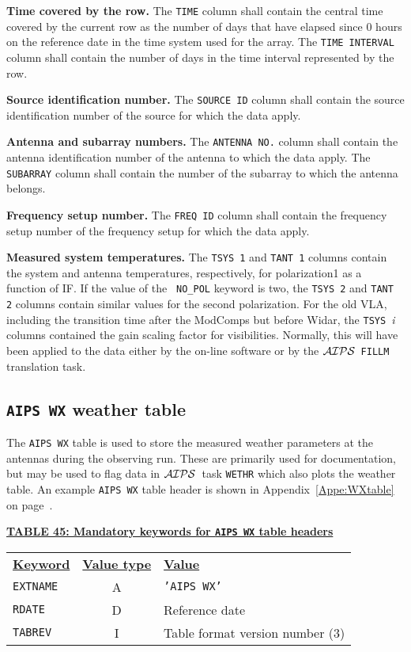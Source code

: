 \documentclass[twoside]{article}
\newcommand{\AIPS}{{$\cal AIPS\/$}}
\begin{document}
{\bf Time covered by the row.}  The {\tt TIME} column shall contain
the central time covered by the current row as the number of days
that have elapsed since 0 hours on the reference date in the time
system used for the array.  The {\tt TIME INTERVAL} column shall
contain the number of days in the time interval represented by the
row.

{\bf Source identification number.}  The {\tt SOURCE ID} column shall
contain the source identification number of the source for which the
data apply.

{\bf Antenna and subarray numbers.}  The {\tt ANTENNA NO.} column
shall contain the antenna identification number of the antenna to
which the data apply.  The {\tt SUBARRAY} column shall contain the
number of the subarray to which the antenna belongs.

{\bf Frequency setup number.}  The {\tt FREQ ID} column shall contain
the frequency setup number of the frequency setup for which the data
apply.

{\bf Measured system temperatures.} The {\tt TSYS 1} and {\tt TANT 1}
columns contain the system and antenna temperatures, respectively,
for polarization1 as a function of IF\@.  If the value of the {\tt
  NO\_POL} keyword is two, the {\tt TSYS 2} and {\tt TANT 2} columns
contain similar values for the second polarization.  For the old VLA,
including the transition time after the ModComps but before Widar,
the {\tt TSYS\ }{\it i} columns contained the gain scaling factor for
visibilities.  Normally, this will have been applied to the data
either by the on-line software or by the \AIPS\ {\tt FILLM}
translation task.

\subsection{{\tt AIPS WX} weather table}
\label{s:WX}

The {\tt AIPS WX} table is used to store the measured weather
parameters at the antennas during the observing run.  These are
primarily used for documentation, but may be used to flag data in
\AIPS\ task {\tt WETHR} which also plots the weather table.  An
example {\tt AIPS WX} table header is shown in
Appendix~\ref{Appe:WXtable} on page~\pageref{Appe:WXtable}.

\begin{center}
\underline{\bf{TABLE 45: Mandatory keywords for {\tt AIPS WX} table
    headers}}\\
\begin{tabular}{lcl}
\noalign{\vspace{2pt}} \label{ta:WXkeys}
\underline{{\bf Keyword}} & \underline{\bf{Value type}} &
    \underline{\bf{Value\vphantom{y}}} \\
\noalign{\vspace{2pt}}
{\tt EXTNAME}   & A & {\tt 'AIPS WX'}  \\
{\tt RDATE}     & D & Reference date\\
{\tt TABREV}    & I & Table format version number (3)
\end{tabular}
\end{center}
\end{document}
